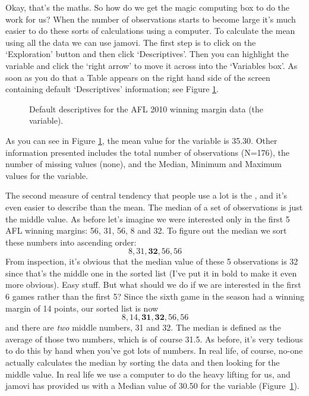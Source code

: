 
Okay, that's the maths. So how do we get the magic computing box to do the work for us? When the number of observations starts to become large it's much easier to do these sorts of calculations using a computer. To calculate the mean using all the data we can use jamovi. The first step is to click on the `Exploration' button and then click `Descriptives'. Then you can highlight the  variable and click the `right arrow' to move it across into the `Variables box'. As soon as you do that a Table appears on the right hand side of the screen containing default `Descriptives' information; see Figure \ref{fig:descriptives_default}. 

\vspace{0.5cm}
\begin{figure}[ht]
\begin{center}
\caption{Default descriptives for the AFL 2010 winning margin data (the  variable). }
\label{fig:descriptives_default}
\HR
\end{center}
\end{figure}

As you can see in Figure \ref{fig:descriptives_default}, the mean value for the  variable is 35.30. Other information presented includes the total number of observations (N=176), the number of missing values (none), and the Median, Minimum and Maximum values for the variable. 


The second measure of central tendency that people use a lot is the , and it's even easier to describe than the mean. The median of a set of observations is just the middle value. As before let's imagine we were interested only in the first 5 AFL winning margins: 56, 31, 56, 8 and 32. To figure out the median we sort these numbers into ascending order:
$$
8, 31, \mathbf{32}, 56, 56
$$
From inspection, it's obvious that the median value of these 5 observations is 32 since that's the middle one in the sorted list (I've put it in bold to make it even more obvious). Easy stuff. But what should we do if we are interested in the first 6 games rather than the first 5? Since the sixth game in the season had a winning margin of 14 points, our sorted list is now 
$$
8, 14, \mathbf{31}, \mathbf{32}, 56, 56
$$
and there are {\it two} middle numbers, 31 and 32. The median is defined as the average of those two numbers, which is of course 31.5. As before, it's very tedious to do this by hand when you've got lots of numbers. In real life, of course, no-one actually calculates the median by sorting the data and then looking for the middle value. In real life we use a computer to do the heavy lifting for us, and jamovi has provided us with a Median value of 30.50 for the  variable (Figure~\ref{fig:descriptives_default}). 

